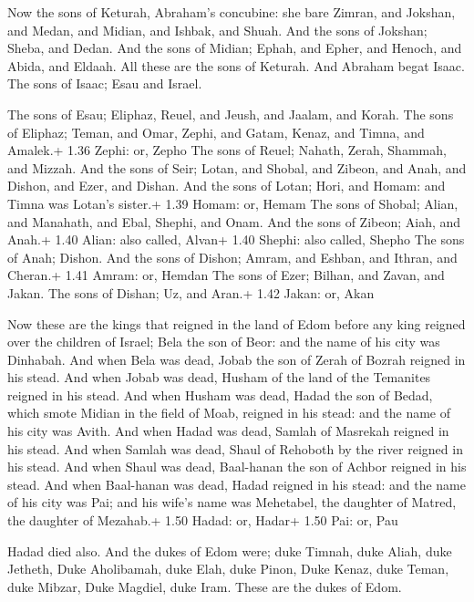  Now the sons of Keturah, Abraham's concubine: she bare
Zimran, and Jokshan, and Medan, and Midian, and Ishbak, and Shuah. And
the sons of Jokshan; Sheba, and Dedan.  And the sons of
Midian; Ephah, and Epher, and Henoch, and Abida, and Eldaah. All these
are the sons of Keturah.  And Abraham begat Isaac. The sons
of Isaac; Esau and Israel.

 The sons of Esau; Eliphaz, Reuel, and Jeush, and Jaalam,
and Korah.  The sons of Eliphaz; Teman, and Omar, Zephi,
and Gatam, Kenaz, and Timna, and Amalek.+ 1.36 Zephi: or, Zepho
 The sons of Reuel; Nahath, Zerah, Shammah, and Mizzah.
 And the sons of Seir; Lotan, and Shobal, and Zibeon, and
Anah, and Dishon, and Ezer, and Dishan.  And the sons of
Lotan; Hori, and Homam: and Timna was Lotan's sister.+ 1.39 Homam: or,
Hemam  The sons of Shobal; Alian, and Manahath, and Ebal,
Shephi, and Onam. And the sons of Zibeon; Aiah, and Anah.+ 1.40 Alian:
also called, Alvan+ 1.40 Shephi: also called, Shepho  The
sons of Anah; Dishon. And the sons of Dishon; Amram, and Eshban, and
Ithran, and Cheran.+ 1.41 Amram: or, Hemdan  The sons of
Ezer; Bilhan, and Zavan, and Jakan. The sons of Dishan; Uz, and Aran.+
1.42 Jakan: or, Akan

 Now these are the kings that reigned in the land of Edom
before any king reigned over the children of Israel; Bela the son of
Beor: and the name of his city was Dinhabah.  And when Bela
was dead, Jobab the son of Zerah of Bozrah reigned in his stead.
 And when Jobab was dead, Husham of the land of the
Temanites reigned in his stead.  And when Husham was dead,
Hadad the son of Bedad, which smote Midian in the field of Moab, reigned
in his stead: and the name of his city was Avith.  And when
Hadad was dead, Samlah of Masrekah reigned in his stead. 
And when Samlah was dead, Shaul of Rehoboth by the river reigned in his
stead.  And when Shaul was dead, Baal-hanan the son of
Achbor reigned in his stead.  And when Baal-hanan was dead,
Hadad reigned in his stead: and the name of his city was Pai; and his
wife's name was Mehetabel, the daughter of Matred, the daughter of
Mezahab.+ 1.50 Hadad: or, Hadar+ 1.50 Pai: or, Pau

 Hadad died also. And the dukes of Edom were; duke
Timnah, duke Aliah, duke Jetheth,  Duke Aholibamah, duke
Elah, duke Pinon,  Duke Kenaz, duke Teman, duke Mibzar,
 Duke Magdiel, duke Iram. These are the dukes of Edom.

